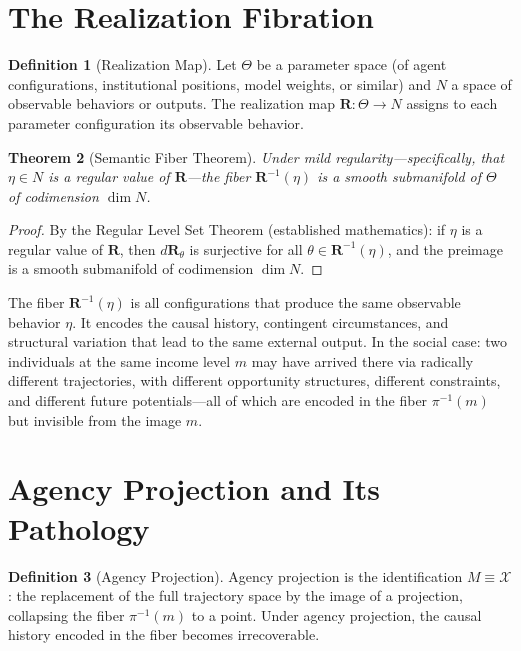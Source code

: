 \documentclass[12pt, oneside]{book}
\theoremstyle{flyxion}
\newtheorem{theorem}{Theorem}[chapter]
\theoremstyle{definition}
\newtheorem{definition}[theorem]{Definition}
\begin{document}
\section{The Realization Fibration}

\begin{definition}[Realization Map]
Let $\Theta$ be a parameter space (of agent configurations,
institutional positions, model weights, or similar)
and $N$ a space of observable behaviors or outputs.
The realization map $\mathbf{R} : \Theta \to N$ assigns
to each parameter configuration its observable behavior.
\end{definition}

\begin{theorem}[Semantic Fiber Theorem]
Under mild regularity---specifically, that $\eta \in N$
is a regular value of $\mathbf{R}$---the fiber
$\mathbf{R}^{-1}(\eta)$ is a smooth submanifold of
$\Theta$ of codimension $\dim N$.
\end{theorem}

\begin{proof}
By the Regular Level Set Theorem (established
mathematics): if $\eta$ is a regular value of
$\mathbf{R}$, then $d\mathbf{R}_\theta$ is surjective
for all $\theta \in \mathbf{R}^{-1}(\eta)$, and the
preimage is a smooth submanifold of codimension
$\dim N$.
\end{proof}

The fiber $\mathbf{R}^{-1}(\eta)$ is all configurations
that produce the same observable behavior $\eta$. It
encodes the causal history, contingent circumstances,
and structural variation that lead to the same external
output. In the social case: two individuals at the same
income level $m$ may have arrived there via radically
different trajectories, with different opportunity
structures, different constraints, and different future
potentials---all of which are encoded in the fiber
$\pi^{-1}(m)$ but invisible from the image $m$.

\section{Agency Projection and Its Pathology}

\begin{definition}[Agency Projection]
Agency projection is the identification $M \equiv
\mathcal{X}$: the replacement of the full trajectory
space by the image of a projection, collapsing the
fiber $\pi^{-1}(m)$ to a point. Under agency
projection, the causal history encoded in the fiber
becomes irrecoverable.
\end{definition}
\end{document}
